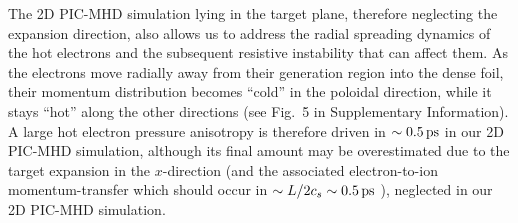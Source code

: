 \documentclass[aps,twocolumn,showpacs,superscriptaddress]{revtex4}
\begin{document}
The  2D PIC-MHD simulation lying in the target plane, therefore neglecting the expansion direction, also allows us to address the radial spreading dynamics of the hot electrons and the subsequent resistive instability that can affect them. As the electrons move radially away from their generation region into the dense foil, their momentum distribution becomes ``cold'' in the poloidal direction, while it stays ``hot'' along the other directions (see Fig.~5 in Supplementary Information). A large hot electron pressure anisotropy is therefore driven in $\sim 0.5\,\rm ps$ in our 2D PIC-MHD simulation, although its final amount may be overestimated due to the target expansion in the $x$-direction (and the associated electron-to-ion momentum-transfer which should occur in $\sim L/2c_s \sim 0.5\,\rm ps$ \cite{PRE_Mora_2005}), neglected in our 2D PIC-MHD simulation. 
\end{document}
